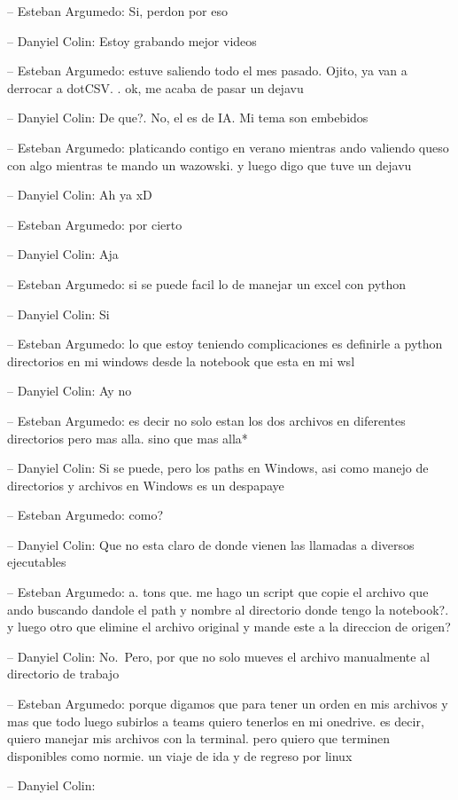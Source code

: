 -- Esteban Argumedo: Si, perdon por eso

-- Danyiel Colin: Estoy grabando mejor videos

-- Esteban Argumedo: estuve saliendo todo el mes pasado. Ojito, ya van a
derrocar a dotCSV. . ok, me acaba de pasar un dejavu

-- Danyiel Colin: De que?. No, el es de IA. Mi tema son embebidos

-- Esteban Argumedo: platicando contigo en verano mientras ando valiendo
queso con algo mientras te mando un wazowski. y luego digo que tuve un
dejavu

-- Danyiel Colin: Ah ya xD

-- Esteban Argumedo: por cierto

-- Danyiel Colin: Aja

-- Esteban Argumedo: si se puede facil lo de manejar un excel con python

-- Danyiel Colin: Si

-- Esteban Argumedo: lo que estoy teniendo complicaciones es definirle a
python directorios en mi windows desde la notebook que esta en mi wsl

-- Danyiel Colin: Ay no

-- Esteban Argumedo: es decir no solo estan los dos archivos en
diferentes directorios pero mas alla. sino que mas alla*

-- Danyiel Colin: Si se puede, pero los paths en Windows, asi como
manejo de directorios y archivos en Windows es un despapaye

-- Esteban Argumedo: como?

-- Danyiel Colin: Que no esta claro de donde vienen las llamadas a
diversos ejecutables

-- Esteban Argumedo: a. tons que. me hago un script que copie el archivo
que ando buscando dandole el path y nombre al directorio donde tengo la
notebook?. y luego otro que elimine el archivo original y mande este a
la direccion de origen?

-- Danyiel Colin: No.~Pero, por que no solo mueves el archivo
manualmente al directorio de trabajo

-- Esteban Argumedo: porque digamos que para tener un orden en mis
archivos y mas que todo luego subirlos a teams quiero tenerlos en mi
onedrive. es decir, quiero manejar mis archivos con la terminal. pero
quiero que terminen disponibles como normie. un viaje de ida y de
regreso por linux

-- Danyiel Colin:

